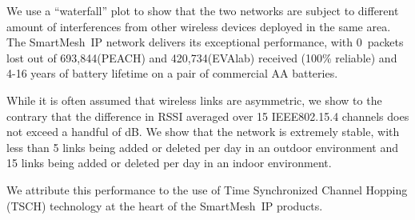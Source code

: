 \documentclass{elsarticle}
\newcommand{\smip}                {SmartMesh~IP\xspace}
\newcommand{\PEACHNUMPCKTS}       {693,844\xspace}
\newcommand{\EVANUMPCKTS}         {420,734\xspace}
\begin{document}

We use a ``waterfall'' plot to show that the two networks are subject to different amount of interferences from other wireless devices deployed in the same area.
The \smip network delivers its exceptional performance, with 0~packets lost out of \PEACHNUMPCKTS (PEACH) and \EVANUMPCKTS (EVAlab) received (100\% reliable) and 4-16 years of battery lifetime on a pair of commercial AA batteries.


While it is often assumed that wireless links are asymmetric, we show to the contrary that the difference in RSSI averaged over 15 IEEE802.15.4 channels does not exceed a handful of dB.
We show that the network is extremely stable, with less than 5 links being added or deleted per day in an outdoor environment and 15 links  being added or deleted per day in an indoor environment.


We attribute this performance to the use of Time Synchronized Channel Hopping (TSCH) technology at the heart of the \smip products.

\newpage
%
%
\end{document}
